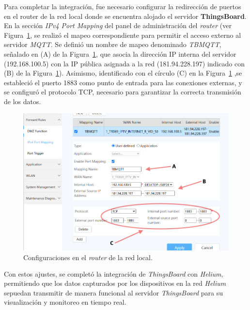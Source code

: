 Para completar la integración, fue necesario configurar la redirección de puertos en el router de la red local donde se encuentra alojado el servidor \textbf{ThingsBoard}. En la sección \textit{IPv4 Port Mapping} del panel de administración del \textit{router} (ver Figura~\ref{fig:routconf}, se realizó el mapeo correspondiente para permitir el acceso externo al servidor \textit{MQTT}. Se definió un nombre de mapeo denominado \textit{TBMQTT}, señalado en (A) de la Figura~\ref{fig:routconf}, que asocia la dirección IP interna del servidor (192.168.100.5) con la IP pública asignada a la red (181.94.228.197) indicado con (B) de la Figura~\ref{fig:routconf}). Asimismo, identificado con el círculo (C) en la Figura~\ref{fig:routconf} ,se estableció el puerto 1883 como punto de entrada para las conexiones externas, y se configuró el protocolo TCP, necesario para garantizar la correcta transmisión de los datos.



\begin{figure}[H]
\leavevmode
\begin{minipage}{\textwidth}
\begin{center}
\includegraphics[width=1.0\textwidth]{./capitulo_04/imagen/tb2/rout_conf.png}
\caption{Configuraciones en el \textit{router} de la red local. \label{fig:routconf}}
\end{center}
\end{minipage}
\end{figure}

Con estos ajustes, se completó la integración de \textit{ThingsBoard} con \textit{Helium}, permitiendo que los datos capturados por los dispositivos en la red \textit{Helium} sepuedan transmitir de manera funcional al servidor \textit{ThingsBoard} para su visualización y monitoreo en tiempo real.

